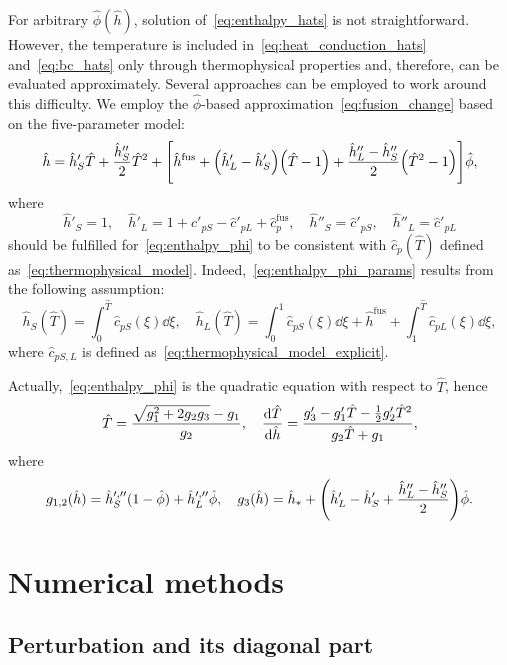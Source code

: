 \documentclass{article}
\newcommand{\fusion}[1]{{#1}^\mathrm{fus}}
\newcommand{\Hh}{\hat{h}}
\newcommand{\HT}{\hat{T}}
\newcommand{\Hc}{\hat{c}}
\newcommand{\Hphi}{\hat{\phi}}
\begin{document}
For arbitrary \(\Hphi(\Hh)\), solution of~\eqref{eq:enthalpy_hats} is not straightforward.
However, the temperature is included in~\eqref{eq:heat_conduction_hats} and~\eqref{eq:bc_hats}
only through thermophysical properties and, therefore, can be evaluated approximately.
Several approaches can be employed to work around this difficulty.
We employ the \(\hat\phi\)-based approximation~\eqref{eq:fusion_change} based on the five-parameter model:
\begin{equation}\label{eq:enthalpy_phi}
	\Hh = \Hh'_S\HT + \frac{\Hh''_S}2\HT^2 + \qty[
	    \fusion{\Hh} + \qty(\Hh'_L-\Hh'_S) \qty(\HT-1) + \frac{\Hh''_L-\Hh''_S}2 \qty( \HT^2-1 )
	]\Hphi,
\end{equation}
where
\begin{equation}\label{eq:enthalpy_phi_params}
	\Hh'_S = 1, \quad \Hh'_L = 1 + \Hc'_{pS} - \Hc'_{pL} + \fusion{\Hc}_p, \quad
	\Hh''_S = \Hc'_{pS}, \quad \Hh''_L = \Hc'_{pL}
\end{equation}
should be fulfilled for~\eqref{eq:enthalpy_phi} to be consistent with \(\Hc_p(\HT)\)
defined as~\eqref{eq:thermophysical_model}.
Indeed,~\eqref{eq:enthalpy_phi_params} results from the following assumption:
\begin{equation}\label{eq:enthalpy_phi_explicit}
	\Hh_S(\HT) = \int_0^{\HT} \Hc_{pS}(\xi)\dd{\xi}, \quad
	\Hh_L(\HT) = \int_0^1 \Hc_{pS}(\xi)\dd{\xi} + \fusion{\Hh} + \int_1^{\HT} \Hc_{pL}(\xi)\dd{\xi},
\end{equation}
where \(\Hc_{pS,L}\) is defined as~\eqref{eq:thermophysical_model_explicit}.

Actually,~\eqref{eq:enthalpy_phi} is the quadratic equation with respect to \(\HT\), hence
\begin{equation}\label{eq:temp_phi}
	\HT = \frac{\sqrt{g_1^2 + 2g_2g_3}-g_1}{g_2}, \quad
	\dv{\HT}{\Hh} = \frac{g_3' - g_1'\HT - \frac12g_2'\HT^2}{g_2\HT + g_1},
\end{equation}
where
\begin{equation}\label{eq:enthalpy3_phi}
    g_{1,2}(\Hh) = \Hh_S^{\prime,\prime\prime} (1-\hat\phi) + \Hh_L^{\prime,\prime\prime}\hat\phi, \quad
	g_3(\Hh) = \Hh_* + \qty(\Hh_L' - \Hh_S' + \frac{\Hh_L'' - \Hh_S''}2)\Hphi.
\end{equation}

\section{Numerical methods}

\subsection{Perturbation and its diagonal part}
\end{document}
